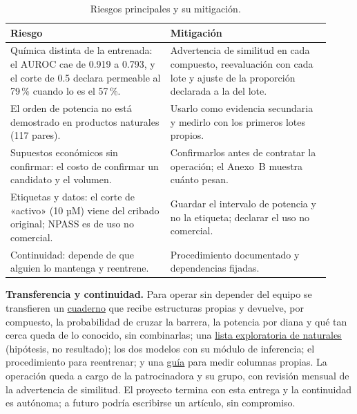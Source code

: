 \documentclass[letterpaper,11pt]{article}
\begin{document}
\smallskip
\begin{table}[h]
\centering
\caption{Riesgos principales y su mitigación.}
\label{tab:riesgos}
\small
\begin{tabular}{@{}p{0.46\linewidth}@{\hspace{0.06\linewidth}}p{0.46\linewidth}@{}}
\toprule
Riesgo & Mitigación\\
\midrule
Química distinta de la entrenada: el AUROC cae de 0.919 a 0.793, y el corte de 0.5 declara permeable al 79\,\% cuando lo es el 57\,\%. & Advertencia de similitud en cada compuesto, reevaluación con cada lote y ajuste de la proporción declarada a la del lote.\\[3pt]
El orden de potencia no está demostrado en productos naturales (117 pares). & Usarlo como evidencia secundaria y medirlo con los primeros lotes propios.\\[3pt]
Supuestos económicos sin confirmar: el costo de confirmar un candidato y el volumen. & Confirmarlos antes de contratar la operación; el Anexo~B muestra cuánto pesan.\\[3pt]
Etiquetas y datos: el corte de «activo» (10 µM) viene del cribado original; NPASS es de uso no comercial. & Guardar el intervalo de potencia y no la etiqueta; declarar el uso no comercial.\\[3pt]
Continuidad: depende de que alguien lo mantenga y reentrene. & Procedimiento documentado y dependencias fijadas.\\
\bottomrule
\end{tabular}
\end{table}

\noindent\textbf{Transferencia y continuidad.} Para operar sin depender del equipo se transfieren un \href{https://github.com/AntonioVazquezMartinez/Bioactive-AI/blob/main/notebooks/06_Uso_de_los_modelos.ipynb}{\underline{cuaderno}} que recibe estructuras propias y devuelve, por compuesto, la probabilidad de cruzar la barrera, la potencia por diana y qué tan cerca queda de lo conocido, sin combinarlas; una \href{https://antoniovazquezmartinez.github.io/Bioactive-AI/contenido/lista-priorizada.html}{\underline{lista exploratoria de naturales}} (hipótesis, no resultado); los dos modelos con su módulo de inferencia; el procedimiento para reentrenar; y una \href{https://github.com/AntonioVazquezMartinez/Bioactive-AI/blob/main/docs/medir-una-representacion.md}{\underline{guía}} para medir columnas propias. La operación queda a cargo de la patrocinadora y su grupo, con revisión mensual de la advertencia de similitud. El proyecto termina con esta entrega y la continuidad es autónoma; a futuro podría escribirse un artículo, sin compromiso.
\end{document}
